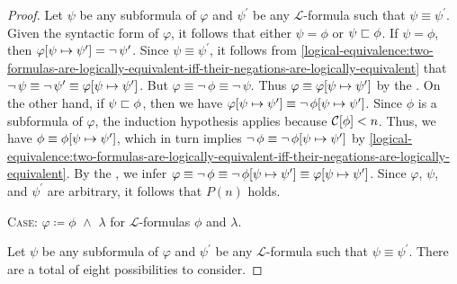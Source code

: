 \begin{proof}
    \vspace{0.1cm}
    \noindent
    Let \( \psi \) be any subformula of \( \varphi \) and \( \psi^{\prime} \) be any \( \mathcal{L} \)-formula such that \( \psi \equiv \psi^{\prime} \).
    Given the syntactic form of \( \varphi \), it follows that either \( \psi = \phi \) or \( \psi  \sqsubset  \phi \).
    If \( \psi = \phi \), then \( \folsubformulasubstitution{\varphi}{\psi}{\psi^{\prime}} = \lnot \, \psi^{\prime} \).
    Since \( \psi \equiv \psi^{\prime} \), it follows from \cref{logical-equivalence:two-formulas-are-logically-equivalent-iff-their-negations-are-logically-equivalent}
    that \( \lnot \, \psi \equiv \lnot \, \psi^{\prime} \equiv \folsubformulasubstitution{\varphi}{\psi}{\psi^{\prime}} \).
    But \( \varphi \equiv \lnot \, \phi \equiv \lnot \, \psi \).
    Thus \( \varphi \equiv \folsubformulasubstitution{\varphi}{\psi}{\psi^{\prime}} \) by the .
    On the other hand, if \( \psi  \sqsubset  \phi \), then we have
    \( \folsubformulasubstitution{\varphi}{\psi}{\psi^{\prime}} \equiv \lnot \, \folsubformulasubstitution{\phi}{\psi}{\psi^{\prime}} \).
    Since \( \phi \) is a subformula of \( \varphi \), the induction hypothesis applies because \( \folcomplexityofformula{\phi} < n \).
    Thus, we have \( \phi \equiv \folsubformulasubstitution{\phi}{\psi}{\psi^{\prime}} \), which in turn implies
    \( \lnot \, \phi \equiv \lnot \, \folsubformulasubstitution{\phi}{\psi}{\psi^{\prime}} \) by
    \cref{logical-equivalence:two-formulas-are-logically-equivalent-iff-their-negations-are-logically-equivalent}.
    By the , we infer
    \( \varphi \equiv \lnot \, \phi \equiv \lnot \, \folsubformulasubstitution{\phi}{\psi}{\psi^{\prime}} \equiv \folsubformulasubstitution{\varphi}{\psi}{\psi^{\prime}} \).
    Since \( \varphi \), \( \psi \), and \( \psi^{\prime} \) are arbitrary, it follows that \( P(n) \) holds.

    \vspace{0.3cm}
    \noindent
    {\scshape Case}: \( \varphi \coloneq \phi \,\,{\land}\,\, \lambda \) for \( \mathcal{L} \)-formulas \( \phi \) and \( \lambda \).

    \vspace{0.1cm}
    \noindent
    Let \( \psi \) be any subformula of \( \varphi \) and \( \psi^{\prime} \) be any \( \mathcal{L} \)-formula such that \( \psi \equiv \psi^{\prime} \). There
    are a total of eight possibilities to consider.


\end{proof}
